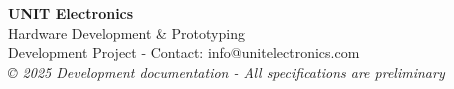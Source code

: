 \documentclass[11pt,a4paper]{article}
\begin{document}
\begin{titlepage}
    \vfill
    
    \begin{tcolorbox}[
        colback=blue!10!white,
        colframe=blue!50!black,
        width=\textwidth,
        arc=0mm,
        boxrule=1pt
    ]
    \centering
    
    {\large \textbf{UNIT Electronics}}\\[0.1cm]
    
    {\small Hardware Development \& Prototyping}\\
    {\footnotesize Development Project - Contact: info@unitelectronics.com}\\
    {\tiny \textit{© 2025 Development documentation - All specifications are preliminary}}
    \end{tcolorbox}
    
\end{titlepage}
\end{document}
